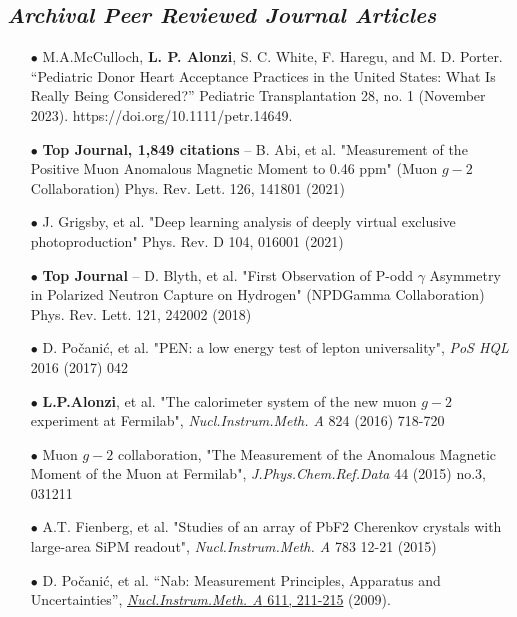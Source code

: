 \documentclass{article}[10pt]
\begin{document}
\subsection*{\emph{Archival Peer Reviewed Journal Articles}}
\begin{itemize}
\item [$\bullet$] M.A.McCulloch, {\bf L. P. Alonzi}, S. C. White, F. Haregu, and M. D. Porter. “Pediatric Donor Heart Acceptance Practices in the United States: What Is Really Being Considered?” Pediatric Transplantation 28, no. 1 (November 2023). https://doi.org/10.1111/petr.14649.
\item [$\bullet$] {\bf \LARGE Top Journal, 1,849 citations} -- B. Abi, et al. "Measurement of the Positive Muon Anomalous Magnetic Moment to 0.46 ppm" (Muon $g-2$ Collaboration) Phys. Rev. Lett. 126, 141801 (2021)
\item [$\bullet$] J. Grigsby, et al. "Deep learning analysis of deeply virtual exclusive photoproduction" Phys. Rev. D 104, 016001 (2021)
\item [$\bullet$] {\bf \LARGE Top Journal} -- D. Blyth, et al. "First Observation of P-odd $\gamma$ Asymmetry in Polarized Neutron Capture on Hydrogen" (NPDGamma Collaboration) Phys. Rev. Lett. 121, 242002 (2018)
\item [$\bullet$] D. Po\v{c}ani\'c, et al. "PEN: a low energy test of lepton universality", \emph{PoS HQL} 2016 (2017) 042
\item [$\bullet$] {\bf L.P.Alonzi}, et al. "The calorimeter system of the new muon $g-2$ experiment at Fermilab", \emph{Nucl.Instrum.Meth. A} 824 (2016) 718-720
\item [$\bullet$] Muon $g-2$ collaboration, "The Measurement of the Anomalous Magnetic Moment of the Muon at Fermilab", \emph{J.Phys.Chem.Ref.Data} 44 (2015) no.3, 031211
\item [$\bullet$] A.T. Fienberg, et al. "Studies of an array of PbF2 Cherenkov crystals with large-area SiPM readout", \emph{Nucl.Instrum.Meth. A} 783 12-21 (2015)
\item [$\bullet$] D. Po\v{c}ani\'c, et al. ``Nab: Measurement Principles, Apparatus and Uncertainties'', \href{http://www.sciencedirect.com/science?_ob=ArticleURL&_udi=B6TJM-4WY6JS6-B&_user=709071&_coverDate=12/11/2009&_rdoc=1&_fmt=high&_orig=search&_origin=search&_sort=d&_docanchor=&view=c&_searchStrId=1563612201&_rerunOrigin=google&_acct=C000039638&_version=1&_urlVersion=0&_userid=709071&md5=602265f8ed1e05dbcd605115545a0871&searchtype=a}{\emph{Nucl.Instrum.Meth. A} 611, 211-215} (2009).


\end{itemize}
\end{document}
